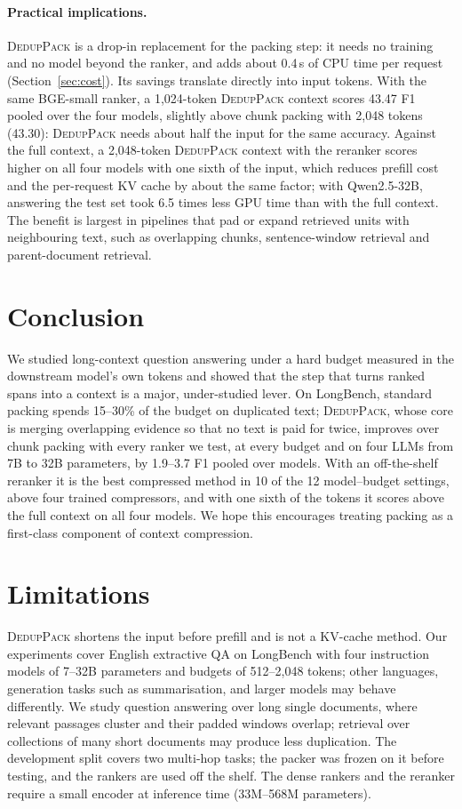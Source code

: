 \documentclass[11pt]{article}
\newcommand{\spk}{\textsc{DedupPack}}
\begin{document}
\paragraph{Practical implications.} \spk{} is a drop-in replacement for the packing step: it needs no training and no model beyond the ranker, and adds about 0.4\,s of CPU time per request (Section~\ref{sec:cost}). Its savings translate directly into input tokens. With the same BGE-small ranker, a 1,024-token \spk{} context scores 43.47 F1 pooled over the four models, slightly above chunk packing with 2,048 tokens (43.30): \spk{} needs about half the input for the same accuracy. Against the full context, a 2,048-token \spk{} context with the reranker scores higher on all four models with one sixth of the input, which reduces prefill cost and the per-request KV cache by about the same factor; with Qwen2.5-32B, answering the test set took 6.5 times less GPU time than with the full context. The benefit is largest in pipelines that pad or expand retrieved units with neighbouring text, such as overlapping chunks, sentence-window retrieval and parent-document retrieval.

\section{Conclusion}
We studied long-context question answering under a hard budget measured in the downstream model's own tokens and showed that the step that turns ranked spans into a context is a major, under-studied lever. On LongBench, standard packing spends 15--30\% of the budget on duplicated text; \spk{}, whose core is merging overlapping evidence so that no text is paid for twice, improves over chunk packing with every ranker we test, at every budget and on four LLMs from 7B to 32B parameters, by 1.9--3.7 F1 pooled over models. With an off-the-shelf reranker it is the best compressed method in 10 of the 12 model--budget settings, above four trained compressors, and with one sixth of the tokens it scores above the full context on all four models. We hope this encourages treating packing as a first-class component of context compression.

\section*{Limitations}
\spk{} shortens the input before prefill and is not a KV-cache method. Our experiments cover English extractive QA on LongBench with four instruction models of 7--32B parameters and budgets of 512--2,048 tokens; other languages, generation tasks such as summarisation, and larger models may behave differently. We study question answering over long single documents, where relevant passages cluster and their padded windows overlap; retrieval over collections of many short documents may produce less duplication. The development split covers two multi-hop tasks; the packer was frozen on it before testing, and the rankers are used off the shelf. The dense rankers and the reranker require a small encoder at inference time (33M--568M parameters).
\end{document}
